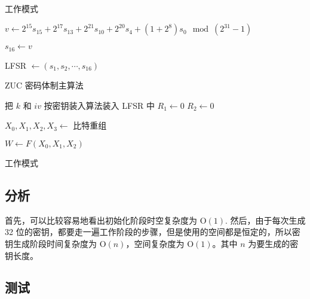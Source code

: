 \documentclass[a4paper, 10pt]{article}
\begin{document}
\begin{algorithm}
\caption{工作模式}

$ v \leftarrow 2^{15} s_{15} + 2^{17} s_{13} + 2^{21} s_{10} + 2^{20} s_{4} + (1 + 2^{8}) s_{0} \mod (2^{31} - 1) $

$ s_{16} \leftarrow v $


LFSR $ \leftarrow (s_1, s_2, \cdots, s_{16}) $
\end{algorithm}

\begin{algorithm}
\caption{ZUC 密码体制主算法}

把 $ k $ 和 $ iv $ 按密钥装入算法装入 LFSR 中
$ R_1 \leftarrow 0 $
$ R_2 \leftarrow 0 $


$ X_0, X_1, X_2, X_3 \leftarrow $ 比特重组

$ W \leftarrow F(X_0, X_1, X_2) $

工作模式

\end{algorithm}






\subsection*{分析}

首先，可以比较容易地看出初始化阶段时空复杂度为 $ \mathrm{O}(1) $. 然后，由于每次生成 32 位的密钥，都要走一遍工作阶段的步骤，但是使用的空间都是恒定的，所以密钥生成阶段时间复杂度为 $ \mathrm{O}(n) $，空间复杂度为 $ \mathrm{O}(1) $。其中 $ n $ 为要生成的密钥长度。

\subsection*{测试}
\end{document}
